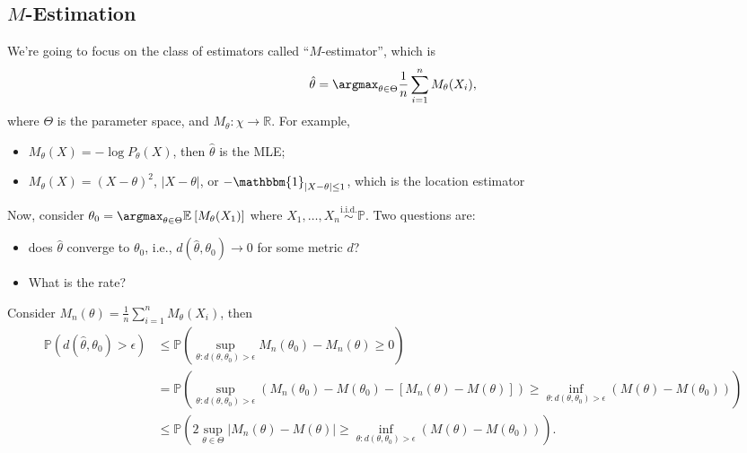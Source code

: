 \subsection{\(M\)-Estimation}
We're going to focus on the class of estimators called ``\(M\)-estimator'', which is
\[
	\hat{\theta} = \argmax_{\theta \in \Theta } \frac{1}{n} \sum_{i=1}^{n} M_\theta (X_i),
\]
where \(\Theta \) is the parameter space, and \(M_\theta \colon \chi \to \mathbb{R} \). For example,
\begin{itemize}
	\item \(M_\theta (X) = - \log P_\theta (X)\), then \(\hat{\theta} \) is the MLE;
	\item \(M_\theta (X) = (X-\theta )^2\),  \(\vert X - \theta  \vert\), or \(- \mathbbm{1}_{\vert X - \theta  \vert \leq 1} \), which is the location estimator
\end{itemize}

Now, consider \(\theta _0 = \argmax_{\theta \in \Theta } \mathbb{E}_{}\left[M_\theta (X_1) \right] \) where \(X_1, \dots , X_n \overset{\text{i.i.d.} }{\sim }\mathbb{P} \). Two questions are:
\begin{itemize}
	\item does \(\hat{\theta} \) converge to \(\theta _0\), i.e., \(d(\hat{\theta} , \theta _0)\to 0\) for some metric \(d\)?
	\item What is the rate?
\end{itemize}

Consider \(M_n(\theta ) = \frac{1}{n} \sum_{i=1}^{n} M_\theta (X_i)\), then
\[
	\begin{split}
		\mathbb{P} (d(\hat{\theta} , \theta _0) > \epsilon )
		&\leq \mathbb{P} \left( \sup _{\theta \colon d(\theta , \theta _0) > \epsilon } M_n(\theta _0) - M_n(\theta ) \geq 0\right) \\
		&= \mathbb{P} \left( \sup _{\theta \colon d(\theta , \theta _0) > \epsilon } \left( M_n(\theta _0) - M(\theta _0) - [M_n(\theta ) - M(\theta )] \right) \geq \inf _{\theta \colon d(\theta , \theta _0) > \epsilon } (M(\theta ) - M(\theta _0)) \right) \\
		&\leq \mathbb{P} \left( 2 \sup_{\theta \in \Theta } \vert M_n(\theta ) - M(\theta ) \vert \geq \inf _{\theta \colon d(\theta , \theta _0) > \epsilon } (M(\theta ) - M(\theta _0)) \right) .
	\end{split}
\]